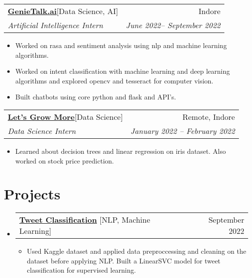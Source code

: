 \documentclass[letterpaper,11pt]{article}
\makeatletter
\newcommand{\resumeItem}[1]{
    \item\small{
      {#1 \vspace{-2pt}}
    }
  }
\newcommand{\resumeSubheading}[4]{
    \vspace{-2pt}\item
      \begin{tabular*}{0.97\textwidth}[t]{l@{\extracolsep{\fill}}r}
        {#1} & #2 \\
        \textit{\small#3} & \textit{\small #4} \\
      \end{tabular*}\vspace{-7pt}
  }
\newcommand{\resumeProjectHeading}[2]{
      \item
      \begin{tabular*}{0.97\textwidth}{l@{\extracolsep{\fill}}r}
        \small#1 & #2 \\
      \end{tabular*}\vspace{-7pt}
  }
\newcommand{\resumeSubHeadingListStart}{\begin{itemize}[leftmargin=0.15in, label={}]}
\newcommand{\resumeSubHeadingListEnd}{\end{itemize}}
\newcommand{\resumeItemListStart}{\begin{itemize}}
\newcommand{\resumeItemListEnd}{\end{itemize}\vspace{-5pt}}
\makeatother
\begin{document}
\resumeSubheading
{\textbf{\href{https://genietalk.ai/}{GenieTalk.ai}\hspace{3pt}}{{[Data Science, AI]}}}{Indore}
{Artificial Intelligence Intern}{June 2022-- September 2022}
\resumeItemListStart
\resumeItem{Worked on rasa and sentiment analysis using nlp and machine learning algorithms. }
 \resumeItem{Worked on intent classification with machine learning and deep learning algorithms and explored opencv and tesseract for computer vision. }
\resumeItem{Built chatbots using core python and flask and API's.}
\resumeItemListEnd


\resumeSubheading
{\textbf{\href{https://letsgrowmore.in/}{Let's Grow More}\hspace{3pt}}{{[Data Science]}}}{Remote, Indore}
{Data Science Intern}{January 2022 -- February 2022}
\resumeItemListStart
\resumeItem{Learned about decision trees and linear regression on iris dataset. Also worked on stock price prediction.}
\resumeItemListEnd




\section{Projects}

\resumeSubHeadingListStart
\resumeProjectHeading
{\textbf{\href{https://github.com/Pragatik19/Kaggle_Projects/tree/main}{Tweet Classification}
\hspace{3pt}}{[NLP, Machine Learning]}}{September 2022}
\resumeItemListStart
\resumeItem{Used Kaggle dataset and applied data preproccessing and cleaning on the dataset before applying NLP. Built a LinearSVC model for tweet classification for supervised learning.}
\resumeItemListEnd
\resumeSubHeadingListEnd
\end{document}
